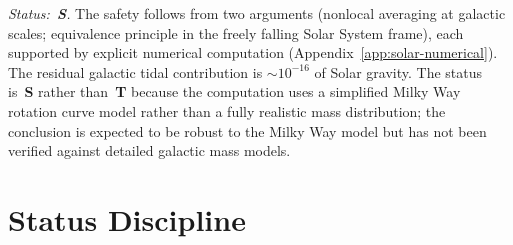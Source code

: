\documentclass[11pt,a4paper]{article}
\begin{document}
\textit{Status:~\textbf{S}.}
The safety follows from two arguments (nonlocal averaging at galactic scales; equivalence principle in the freely falling Solar System frame), each supported by explicit numerical computation (Appendix~\ref{app:solar-numerical}).
The residual galactic tidal contribution is ${\sim}10^{-16}$ of Solar gravity.
The status is~\textbf{S} rather than~\textbf{T} because the computation uses a simplified Milky Way rotation curve model rather than a fully realistic mass distribution; the conclusion is expected to be robust to the Milky Way model but has not been verified against detailed galactic mass models.

\section{Status Discipline}
\label{sec:status-table}
\end{document}
